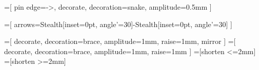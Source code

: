 =[
  pin edge={->, decorate, decoration={snake, amplitude=0.5mm}}
]

=[
  arrows={Stealth[inset=0pt, angle'=30]-Stealth[inset=0pt, angle'=30]}
]

\newcommand{\bottommeasure}[4][5mm] {
  \begin{scope}[line width=0.1mm]
    \coordinate (x) at ([yshift=-#1] #3);
    \draw (x) [measure] -- node [label={[label distance=-1mm]above:#2}] {} (x -| #4);
    \draw (#3) -- ++(0, -#1) -- +(0, -1.25mm);
    \draw (#4) -- ++(0, -#1) -- +(0, -1.25mm);
  \end{scope}
}

\newcommand{\topmeasure}[4][5mm] {
  \begin{scope}[line width=0.1mm]
    \coordinate (x) at ([yshift=#1] #3);
    \draw (x) [measure] -- node [label={[label distance=-1mm]above:#2}] {} (x -| #4);
    \draw (#3) -- ++(0, #1) -- +(0, 1.25mm);
    \draw (#4) -- ++(0, #1) -- +(0, 1.25mm);
  \end{scope}
}

=[
  decorate, decoration={brace, amplitude=1mm, raise=1mm, mirror}
]
=[
  decorate, decoration={brace, amplitude=1mm, raise=1mm}
]
=[shorten <=2mm]
=[shorten >=2mm]

\newcommand{\bracetobrace}[4] {
  \coordinate (a) at (#1);
  \coordinate (b) at (#2);
  \coordinate (c) at (#3);
  \coordinate (d) at (#4);
  \draw [bottombrace] (a) -- coordinate (e) (b);
  \draw [topbrace] (c) -- coordinate (f) (d);
  \draw [from brace, to brace, smooth, arrow] (e) to (f);
}

\newcommand{\toppointer}[2] {
  \draw ([yshift=1mm] #1) [Latex-] -- ([yshift=1cm] #1) node [anchor=south] {#2};
}
